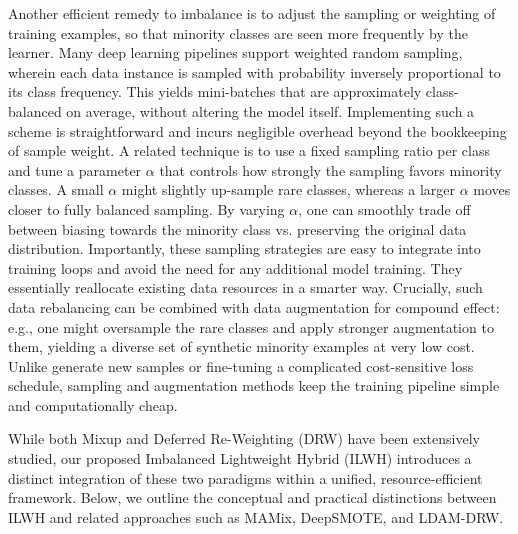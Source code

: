 Another efficient remedy to imbalance is to adjust the sampling or weighting of training examples, so that minority classes are seen more frequently by the learner. Many deep learning pipelines support weighted random sampling, wherein each data instance is sampled with probability inversely proportional to its class frequency. This yields mini-batches that are approximately class-balanced on average, without altering the model itself. Implementing such a scheme is straightforward and incurs negligible overhead beyond the bookkeeping of sample weight. 
A related technique is to use a fixed sampling ratio per class and tune a parameter $\alpha$ that controls how strongly the sampling favors minority classes. A small $\alpha$ might slightly up-sample rare classes, whereas a larger $\alpha$ moves closer to fully balanced sampling. By varying $\alpha$, one can smoothly trade off between biasing towards the minority class vs. preserving the original data distribution. Importantly, these sampling strategies are easy to integrate into training loops and avoid the need for any additional model training. They essentially reallocate existing data resources in a smarter way. Crucially, such data rebalancing can be combined with data augmentation for compound effect: e.g., one might oversample the rare classes and apply stronger augmentation to them, yielding a diverse set of synthetic minority examples at very low cost. Unlike generate new samples or fine-tuning a complicated cost-sensitive loss schedule, sampling and augmentation methods keep the training pipeline simple and computationally cheap. 

While both Mixup and Deferred Re-Weighting (DRW) have been extensively studied, our proposed Imbalanced Lightweight Hybrid (ILWH) introduces a distinct integration of these two paradigms within a unified, resource-efficient framework. Below, we outline the conceptual and practical distinctions between ILWH and related approaches such as MAMix, DeepSMOTE, and LDAM-DRW.

